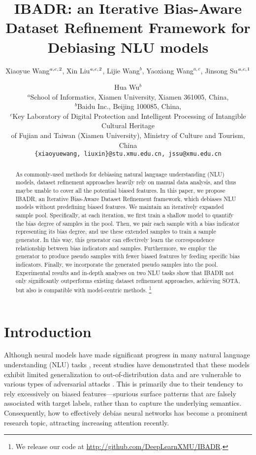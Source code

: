 \documentclass[11pt]{article}
\title{IBADR: an Iterative Bias-Aware Dataset Refinement Framework for Debiasing NLU models}
\author{Xiaoyue Wang$^{a,c,}\footnotemark[2]$, Xin Liu$^{a,c,}\footnotemark[2]$, Lijie Wang$^b$, Yaoxiang Wang$^{a,c}$,  Jinsong Su$^{a,c,}\footnotemark[1]$ \and Hua Wu$^b$ \\
$^a$School of Informatics, Xiamen University, Xiamen 361005, China,\\ 
$^b$Baidu Inc., Beijing 100085, China,\\
$^c$Key Laboratory of Digital Protection and Intelligent Processing  of Intangible Cultural Heritage \\ of Fujian and Taiwan (Xiamen University), Ministry of Culture and Tourism, China\\
\texttt{\{xiaoyuewang, liuxin\}@stu.xmu.edu.cn, jssu@xmu.edu.cn}}
\def\model{\textsc{IBADR}\xspace}
\begin{document}
\maketitle
\begin{abstract}
As commonly-used methods for debiasing natural language understanding (NLU) models, dataset refinement approaches heavily rely on manual data analysis, and thus maybe unable to cover all the potential biased features.
In this paper, we propose \model, an Iterative Bias-Aware Dataset Refinement framework, which debiases NLU models without predefining biased features. We maintain an iteratively expanded sample pool. Specifically, at each iteration,
we first train a shallow model to quantify the bias degree of samples in the pool. Then, 
we pair each sample with a bias indicator representing its bias degree, and use these extended samples to train a sample generator. In this way,
this generator can effectively learn the correspondence relationship between bias indicators and samples. Furthermore, we employ the generator to produce pseudo samples with fewer biased features by feeding specific bias indicators. Finally,
we incorporate the generated pseudo samples into the pool. Experimental results and in-depth analyses on two NLU tasks show that \model not only significantly outperforms existing dataset refinement approaches, achieving SOTA, but also is compatible with model-centric methods. \footnote{We release our code at \url{http://github.com/DeepLearnXMU/IBADR}.}
\end{abstract}

\renewcommand{\thefootnote}{\fnsymbol{footnote}}

\section{Introduction}
Although neural models have made significant progress in many natural language understanding (NLU) tasks 
 \cite{Bowman2015,gururangan-etal-2018-annotation}, recent studies have demonstrated that these models exhibit limited generalization to out-of-distribution data and are vulnerable to various types of adversarial attacks \cite{DasguptaGSGG18, McCoyPL19}. This is primarily due to their tendency to rely excessively on biased features---spurious surface patterns that are falsely associated with target labels, rather than to capture the underlying semantics. Consequently, how to effectively debias neural networks has become a prominent research topic, attracting increasing attention recently.
\end{document}
